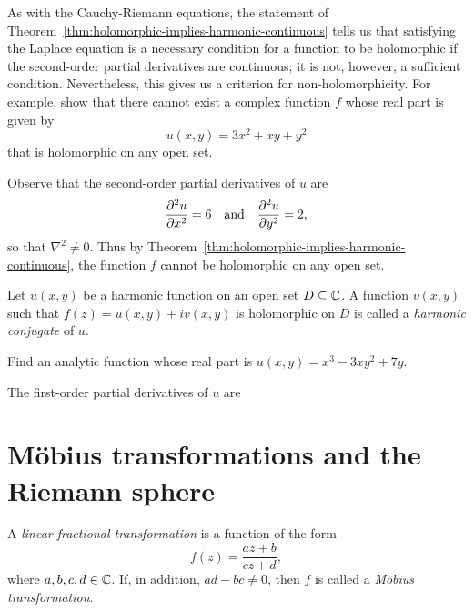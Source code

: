 \begin{example}
    As with the Cauchy-Riemann equations, the statement of Theorem~\ref{thm:holomorphic-implies-harmonic-continuous} tells us that satisfying the Laplace equation is a necessary condition for a function to be holomorphic if the second-order partial derivatives are continuous; it is not, however, a sufficient condition. Nevertheless, this gives us a criterion for non-holomorphicity. For example, show that there cannot exist a complex function \(f\) whose real part is given by
    \[
        u(x, y) = 3x^2 + xy + y^2
    \]
    that is holomorphic on any open set.

    \begin{solution}
        Observe that the second-order partial derivatives of \(u\) are
        \[
            \frac{\partial ^2u}{\partial x^2} = 6 \quad \text{and} \quad \frac{\partial ^2u}{\partial y^2} = 2,
        \]
        so that \(\nabla^2 \neq 0\). Thus by Theorem~\ref{thm:holomorphic-implies-harmonic-continuous}, the function \(f\) cannot be holomorphic on any open set.
    \end{solution}
\end{example}

\begin{definition}
    Let \(u(x, y)\) be a harmonic function on an open set \(D \subseteq \mathbb{C}\). A function \(v(x, y)\) such that \(f(z) = u(x, y) + iv(x, y)\) is holomorphic on \(D\) is called a \emph{harmonic conjugate} of \(u\).
\end{definition}

\begin{example}
    Find an analytic function whose real part is \(u(x, y) = x^3 - 3xy^2 + 7y\).

    \begin{solution}
        The first-order partial derivatives of \(u\) are
    \end{solution}
\end{example}

\section{Möbius transformations and the Riemann sphere}

\begin{definition}
    A \emph{linear fractional transformation} is a function of the form
    \[
        f(z) = \frac{az + b}{cz + d},
    \]
    where \(a, b, c, d \in \mathbb{C}\). If, in addition, \(ad - bc \neq 0\), then \(f\) is called a \emph{Möbius transformation}.
\end{definition}

